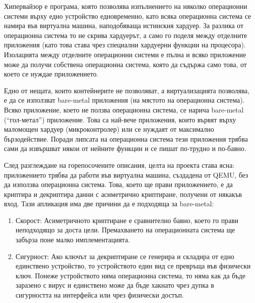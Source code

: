 Хипервайзор е програма, която позволява изпълнението на няколко операционни системи върху едно устройство едновременно, като всяка операционна система се намира във виртуална машина, наподобяваща истинския хардуер. За разлика от операционна система то не скрива хардуерът, а само го поделя между отделните приложения (като това става чрез специални хардуерни функции на процесора). Изолацията между отделните операционни системи е пълна и всяко приложение може да получи собствена операционна система, която да съдържа само това, от което се нуждае приложението.

Едно от нещата, които контейнерите не позволяват, а виртуализацията позволява, е да се използват bare-metal приложения (на мястото на операционна система).
Всяко приложение, което не ползва операционна система, се нарича bare-metal (``гол-метал'') приложение. Това са най-вече приложения, които вървят върху маломощен хардуер (микроконтролер) или се нуждаят от максимално бързодействие. Поради липсата на операционна система тези приложения трябва сами да извършват някои от нейните функции и се пишат по-трудно и по-бавно.


След разглеждане на горепосочените описания, целта на проекта става ясна: приложението трябва да работи във виртуална машина, създадена от QEMU, без да използва операционна система. Това, което ще прави приложението, е да криптира и декриптира данни с асиметрично криптиране, получени от някакъв вход. Тази апликация има две причини да е подходяща за bare-metal:
\begin{enumerate}
  \item Скорост: Асиметричното криптиране е сравнително бавно, което го прави неподходящо за доста цели. Премахването на операционната система ще забърза поне малко имплементацията.
  \item Сигурност: Ако ключът за декриптиране се генерира и складира от едно единствено устройство, то устройството един вид се превръща във физически ключ. Понеже устройството няма операционна система, то няма как да бъде заразено с вирус и единствено може да бъде хакнато чрез дупка в сигурността на интерфейса или чрез физически достъп.
\end{enumerate}


